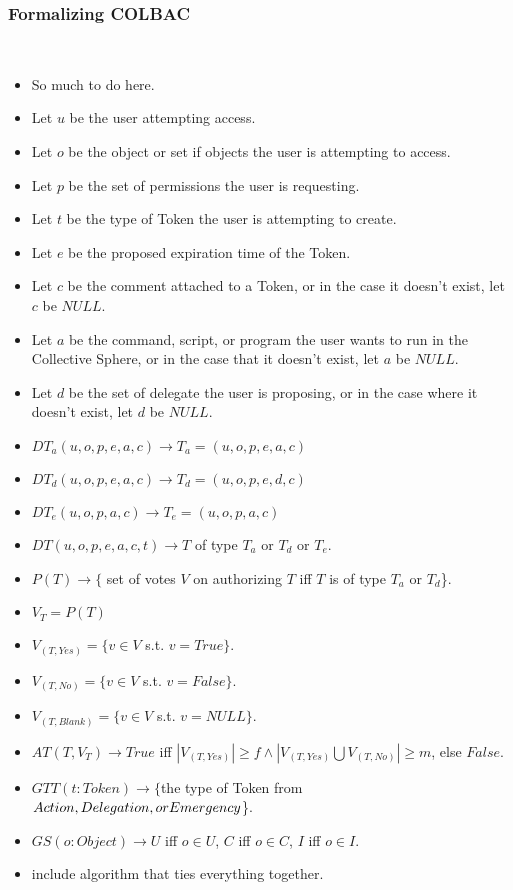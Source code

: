 \subsubsection{Formalizing COLBAC}
\mbox{}\\
\begin{itemize}
\item So much to do here.
\item Let $u$ be the user attempting access.
\item Let $o$ be the object or set if objects the user is attempting to
access.
\item Let $p$ be the set of permissions the user is requesting.
\item Let $t$ be the type of Token the user is attempting to create.
\item Let $e$ be the proposed expiration time of the Token.
\item Let $c$ be the comment attached to a Token, or in the case it doesn't
exist, let $c$ be $NULL$.
\item Let $a$ be the command, script, or program the user wants to run in
the Collective Sphere, or in the case that it doesn't exist, let $a$ be $NULL$.
\item Let $d$ be the set of delegate the user is proposing, or in the case
where it doesn't exist, let $d$ be $NULL$.
\item $DT_{a}(u,o,p,e,a,c) \rightarrow T_{a} = (u,o,p,e,a,c)$
\item $DT_{d}(u,o,p,e,a,c) \rightarrow T_{d} = (u,o,p,e,d,c)$
\item $DT_{e}(u,o,p,a,c) \rightarrow T_{e} = (u,o,p,a,c)$
\item $DT(u,o,p,e,a,c,t) \rightarrow T$ of type $T_{a}$ or $T_{d}$ or $T_{e}$.
\item $P(T) \rightarrow \{ $ set of votes $V$ on authorizing $T$ iff $T$ is of
type $T_{a}$ or $T_{d}$\}.
\item $V_{T} = P(T)$
\item $V_{(T, Yes)} = \{v \in V$ s.t. $v = True\}.$
\item $V_{(T, No)} = \{v \in V$ s.t. $v = False\}.$
\item $V_{(T, Blank)} = \{v \in V$ s.t. $v = NULL\}$.
\item $AT(T,V_{T}) \rightarrow True$ iff $|V_{(T, Yes)}| \ge f \wedge
|V_{(T,Yes)} \bigcup V_{(T, No)}| \ge m$, else $False$.
\item $GTT(t:Token) \rightarrow \{$the type of Token from $Action, Delegation,\\
or Emergency$\}.
\item $GS(o:Object) \rightarrow U$ iff $o \in U$, $C$ iff $o \in C$, $I$ iff
$o \in I$.
\item include algorithm that ties everything together.
\end{itemize}
